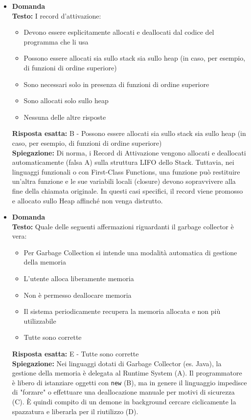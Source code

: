 \documentclass[12pt, a4paper]{article}
\newcounter{domandateoria}
\begin{document}
\begin{itemize}
    \item {}\textbf{Domanda \thedomandateoria} \\
    \textbf{Testo:} I record d'attivazione:
    \begin{itemize}
        \item[A)] Devono essere esplicitamente allocati e deallocati dal codice del programma che li usa
        \item[B)] Possono essere allocati sia sullo stack sia sullo heap (in caso, per esempio, di funzioni di ordine superiore)
        \item[C)] Sono necessari solo in presenza di funzioni di ordine superiore
        \item[D)] Sono allocati solo sullo heap
        \item[E)] Nessuna delle altre risposte
    \end{itemize}
    \textbf{Risposta esatta:} B - Possono essere allocati sia sullo stack sia sullo heap (in caso, per esempio, di funzioni di ordine superiore) \\
    \textbf{Spiegazione:} Di norma, i Record di Attivazione vengono allocati e deallocati automaticamente (falsa A) sulla struttura LIFO dello Stack. Tuttavia, nei linguaggi funzionali o con First-Class Functions, una funzione può restituire un'altra funzione e le sue variabili locali (closure) devono sopravvivere alla fine della chiamata originale. In questi casi specifici, il record viene promosso e allocato sullo Heap affinché non venga distrutto.
    \vspace{0.3cm}

    \item {}\textbf{Domanda \thedomandateoria} \\
    \textbf{Testo:} Quale delle seguenti affermazioni riguardanti il garbage collector è vera:
    \begin{itemize}
        \item[A)] Per Garbage Collection si intende una modalità automatica di gestione della memoria
        \item[B)] L'utente alloca liberamente memoria
        \item[C)] Non è permesso deallocare memoria
        \item[D)] Il sistema periodicamente recupera la memoria allocata e non più utilizzabile
        \item[E)] Tutte sono corrette
    \end{itemize}
    \textbf{Risposta esatta:} E - Tutte sono corrette \\
    \textbf{Spiegazione:} Nei linguaggi dotati di Garbage Collector (es. Java), la gestione della memoria è delegata al Runtime System (A). Il programmatore è libero di istanziare oggetti con \texttt{new} (B), ma in genere il linguaggio impedisce di "forzare" o effettuare una deallocazione manuale per motivi di sicurezza (C). È quindi compito di un demone in background cercare ciclicamente la spazzatura e liberarla per il riutilizzo (D).
    \vspace{0.3cm}


\end{itemize}
\end{document}

